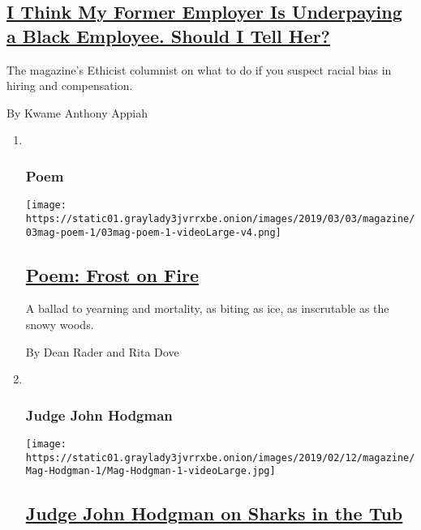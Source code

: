 \begin{enumerate}
{  \subsection{\texorpdfstring{\href{/2019/02/26/magazine/i-think-my-former-employer-is-underpaying-a-black-employee-should-i-tell-her.html}{I
  Think My Former Employer Is Underpaying a Black Employee. Should I
  Tell
  Her?}}{I Think My Former Employer Is Underpaying a Black Employee. Should I Tell Her?}}\label{i-think-my-former-employer-is-underpaying-a-black-employee-should-i-tell-her}}

  The magazine's Ethicist columnist on what to do if you suspect racial
  bias in hiring and compensation.

  By Kwame Anthony Appiah
\end{enumerate}

\begin{enumerate}
\def\labelenumi{\arabic{enumi}.}
\item ~
  \hypertarget{poem}{%
  \subsubsection{Poem}\label{poem}}

  \texttt{[image: https://static01.graylady3jvrrxbe.onion/images/2019/03/03/magazine/03mag-poem-1/03mag-poem-1-videoLarge-v4.png]}

  \hypertarget{poem-frost-on-fire}{%
  \subsection{\texorpdfstring{\href{/2019/02/28/magazine/poem-frost-on-fire.html}{Poem:
  Frost on Fire}}{Poem: Frost on Fire}}\label{poem-frost-on-fire}}

  A ballad to yearning and mortality, as biting as ice, as inscrutable
  as the snowy woods.

  By Dean Rader and Rita Dove
\item ~
  \hypertarget{judge-john-hodgman}{%
  \subsubsection{Judge John Hodgman}\label{judge-john-hodgman}}

  \texttt{[image: https://static01.graylady3jvrrxbe.onion/images/2019/02/12/magazine/Mag-Hodgman-1/Mag-Hodgman-1-videoLarge.jpg]}

  \hypertarget{judge-john-hodgman-on-sharks-in-the-tub}{%
  \subsection{\texorpdfstring{\href{/2019/02/28/magazine/judge-john-hodgman-on-sharks-in-the-tub.html}{Judge
  John Hodgman on Sharks in the
  Tub}}{Judge John Hodgman on Sharks in the Tub}}\label{judge-john-hodgman-on-sharks-in-the-tub}}


\end{enumerate}
